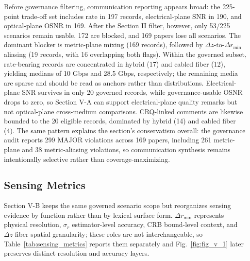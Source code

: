 \documentclass[letterpaper,journal]{IEEEtran}
\begin{document}
Before governance filtering, communication reporting appears broad: the 225-point trade-off set includes rate in 197 records, electrical-plane SNR in 190, and optical-plane OSNR in 169. After the Section II filter, however, only 53/225 scenarios remain usable, 172 are blocked, and 169 papers lose all scenarios. The dominant blocker is metric-plane mixing (169 records), followed by $\Delta z$-to-$\Delta r_{\min}$ aliasing (19 records, with 16 overlapping both flags). Within the governed subset, rate-bearing records are concentrated in hybrid (17) and cabled fiber (12), yielding medians of 10 Gbps and 28.5 Gbps, respectively; the remaining media are sparse and should be read as anchors rather than distributions. Electrical-plane SNR survives in only 20 governed records, while governance-usable OSNR drops to zero, so Section V-A can support electrical-plane quality remarks but not optical-plane cross-medium comparisons. CRQ-linked comments are likewise bounded to the 20 eligible records, dominated by hybrid (14) and cabled fiber (4). The same pattern explains the section's conservatism overall: the governance audit reports 299 MAJOR violations across 169 papers, including 261 metric-plane and 38 metric-aliasing violations, so communication synthesis remains intentionally selective rather than coverage-maximizing.

\subsection{Sensing Metrics}
Section V-B keeps the same governed scenario scope but reorganizes sensing evidence by function rather than by lexical surface form. $\Delta r_{\min}$ represents physical resolution, $\sigma_r$ estimator-level accuracy, CRB bound-level context, and $\Delta z$ fiber spatial granularity; these roles are not interchangeable, so Table~\ref{tab:sensing_metrics} reports them separately and Fig.~\ref{fig:fig_v_1} later preserves distinct resolution and accuracy layers.
\end{document}
